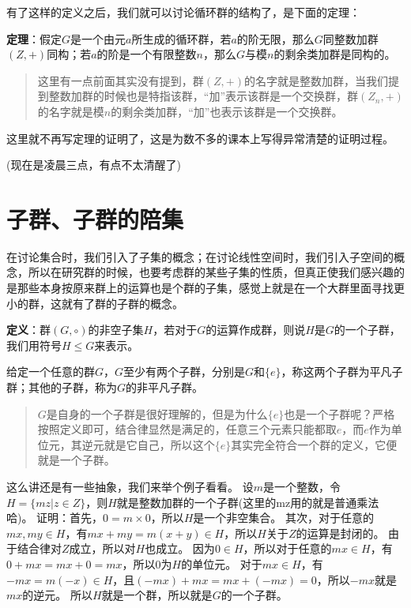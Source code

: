 \documentclass[12pt, a4paper, oneside]{ctexart}
\newenvironment{myquote}{\begin{quote}\small\color{gray}}{\end{quote}}
\begin{document}
有了这样的定义之后，我们就可以讨论循环群的结构了，是下面的定理：

\textbf{定理}：假定$G$是一个由元$a$所生成的循环群，若$a$的阶无限，那么$G$同整数加群$(Z,+)$同构；若$a$的阶是一个有限整数$n$，那么$G$与模$n$的剩余类加群是同构的。

\begin{myquote}
这里有一点前面其实没有提到，群$(Z,+)$的名字就是整数加群，当我们提到整数加群的时候也是特指该群，“加”表示该群是一个交换群，群$(Z_n,+)$的名字就是模$n$的剩余类加群，“加”也表示该群是一个交换群。
\end{myquote}

这里就不再写定理的证明了，这是为数不多的课本上写得异常清楚的证明过程。

(现在是凌晨三点，有点不太清醒了)

\section{子群、子群的陪集}

在讨论集合时，我们引入了子集的概念；在讨论线性空间时，我们引入子空间的概念，所以在研究群的时候，也要考虑群的某些子集的性质，但真正使我们感兴趣的是那些本身按原来群上的运算也是个群的子集，感觉上就是在一个大群里面寻找更小的群，这就有了群的子群的概念。

\textbf{定义}：群$(G,\circ)$的非空子集$H$，若对于$G$的运算作成群，则说$H$是$G$的一个子群，我们用符号$H\leqslant G$来表示。

给定一个任意的群$G$，$G$至少有两个子群，分别是$G$和$\{e\}$，称这两个子群为平凡子群；其他的子群，称为$G$的非平凡子群。

\begin{myquote}
$G$是自身的一个子群是很好理解的，但是为什么$\{e\}$也是一个子群呢？严格按照定义即可，结合律显然是满足的，任意三个元素只能都取$e$，而$e$作为单位元，其逆元就是它自己，所以这个$\{e\}$其实完全符合一个群的定义，它便就是一个子群。
\end{myquote}

这么讲还是有一些抽象，我们来举个例子看看。
设$m$是一个整数，令$H=\{mz|z\in Z\}$，则$H$就是整数加群的一个子群(这里的mz用的就是普通乘法哈)。
证明：首先，$0=m\times 0$，所以$H$是一个非空集合。
其次，对于任意的$mx,my\in H$，有$mx+my=m(x+y)\in H$，所以$H$关于$Z$的运算是封闭的。
由于结合律对$Z$成立，所以对$H$也成立。
因为$0\in H$，所以对于任意的$mx\in H$，有$0+mx=mx+0=mx$，所以0为$H$的单位元。
对于$mx\in H$，有$-mx=m(-x)\in H$，且$(-mx)+mx=mx+(-mx)=0$，所以$-mx$就是$mx$的逆元。
所以$H$就是一个群，所以就是$G$的一个子群。
\end{document}
